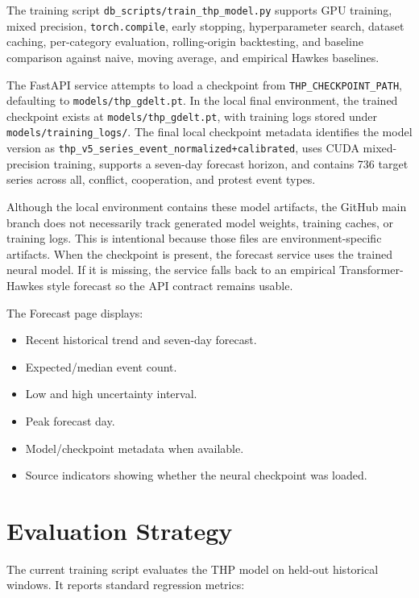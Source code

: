 \documentclass[11pt]{article}
\begin{document}
The training script \texttt{db\_scripts/train\_thp\_model.py} supports GPU training, mixed precision, \texttt{torch.compile}, early stopping, hyperparameter search, dataset caching, per-category evaluation, rolling-origin backtesting, and baseline comparison against naive, moving average, and empirical Hawkes baselines.

The FastAPI service attempts to load a checkpoint from \texttt{THP\_CHECKPOINT\_PATH}, defaulting to \texttt{models/thp\_gdelt.pt}. In the local final environment, the trained checkpoint exists at \texttt{models/thp\_gdelt.pt}, with training logs stored under \texttt{models/training\_logs/}. The final local checkpoint metadata identifies the model version as \texttt{thp\_v5\_series\_event\_normalized+calibrated}, uses CUDA mixed-precision training, supports a seven-day forecast horizon, and contains 736 target series across all, conflict, cooperation, and protest event types.

Although the local environment contains these model artifacts, the GitHub main branch does not necessarily track generated model weights, training caches, or training logs. This is intentional because those files are environment-specific artifacts. When the checkpoint is present, the forecast service uses the trained neural model. If it is missing, the service falls back to an empirical Transformer-Hawkes style forecast so the API contract remains usable.

The Forecast page displays:

\begin{itemize}
    \item Recent historical trend and seven-day forecast.
    \item Expected/median event count.
    \item Low and high uncertainty interval.
    \item Peak forecast day.
    \item Model/checkpoint metadata when available.
    \item Source indicators showing whether the neural checkpoint was loaded.
\end{itemize}

\section{Evaluation Strategy}

The current training script evaluates the THP model on held-out historical windows. It reports standard regression metrics:
\end{document}
